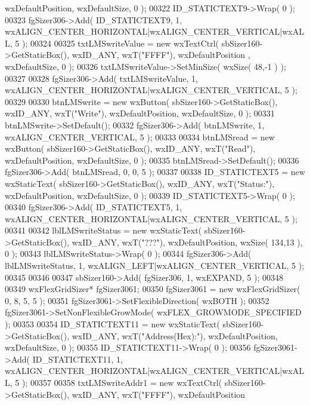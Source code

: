 \begin{DoxyCode}
      wxDefaultPosition, wxDefaultSize, 0 );
00322     ID_STATICTEXT9->Wrap( 0 );
00323     fgSizer306->Add( ID_STATICTEXT9, 1, wxALIGN\_CENTER\_HORIZONTAL|wxALIGN\_CENTER\_VERTICAL|wxALL, 5 );
00324     
00325     txtLMSwriteValue = \textcolor{keyword}{new} wxTextCtrl( sbSizer160->GetStaticBox(), wxID\_ANY, wxT(\textcolor{stringliteral}{"FFFF"}), wxDefaultPosition
      , wxDefaultSize, 0 );
00326     txtLMSwriteValue->SetMinSize( wxSize( 48,-1 ) );
00327     
00328     fgSizer306->Add( txtLMSwriteValue, 1, wxALIGN\_CENTER\_HORIZONTAL|wxALIGN\_CENTER\_VERTICAL, 5 );
00329     
00330     btnLMSwrite = \textcolor{keyword}{new} wxButton( sbSizer160->GetStaticBox(), wxID\_ANY, wxT(\textcolor{stringliteral}{"Write"}), wxDefaultPosition, 
      wxDefaultSize, 0 );
00331     btnLMSwrite->SetDefault(); 
00332     fgSizer306->Add( btnLMSwrite, 1, wxALIGN\_CENTER\_VERTICAL, 5 );
00333     
00334     btnLMSread = \textcolor{keyword}{new} wxButton( sbSizer160->GetStaticBox(), wxID\_ANY, wxT(\textcolor{stringliteral}{"Read"}), wxDefaultPosition, 
      wxDefaultSize, 0 );
00335     btnLMSread->SetDefault(); 
00336     fgSizer306->Add( btnLMSread, 0, 0, 5 );
00337     
00338     ID_STATICTEXT5 = \textcolor{keyword}{new} wxStaticText( sbSizer160->GetStaticBox(), wxID\_ANY, wxT(\textcolor{stringliteral}{"Status:"}), 
      wxDefaultPosition, wxDefaultSize, 0 );
00339     ID_STATICTEXT5->Wrap( 0 );
00340     fgSizer306->Add( ID_STATICTEXT5, 1, wxALIGN\_CENTER\_HORIZONTAL|wxALIGN\_CENTER\_VERTICAL, 5 );
00341     
00342     lblLMSwriteStatus = \textcolor{keyword}{new} wxStaticText( sbSizer160->GetStaticBox(), wxID\_ANY, wxT(\textcolor{stringliteral}{"???"}), 
      wxDefaultPosition, wxSize( 134,13 ), 0 );
00343     lblLMSwriteStatus->Wrap( 0 );
00344     fgSizer306->Add( lblLMSwriteStatus, 1, wxALIGN\_LEFT|wxALIGN\_CENTER\_VERTICAL, 5 );
00345     
00346     
00347     sbSizer160->Add( fgSizer306, 1, wxEXPAND, 5 );
00348     
00349     wxFlexGridSizer* fgSizer3061;
00350     fgSizer3061 = \textcolor{keyword}{new} wxFlexGridSizer( 0, 8, 5, 5 );
00351     fgSizer3061->SetFlexibleDirection( wxBOTH );
00352     fgSizer3061->SetNonFlexibleGrowMode( wxFLEX\_GROWMODE\_SPECIFIED );
00353     
00354     ID_STATICTEXT11 = \textcolor{keyword}{new} wxStaticText( sbSizer160->GetStaticBox(), wxID\_ANY, wxT(\textcolor{stringliteral}{"Address(Hex):"}), 
      wxDefaultPosition, wxDefaultSize, 0 );
00355     ID_STATICTEXT11->Wrap( 0 );
00356     fgSizer3061->Add( ID_STATICTEXT11, 1, wxALIGN\_CENTER\_HORIZONTAL|wxALIGN\_CENTER\_VERTICAL|wxALL, 5 );
00357     
00358     txtLMSwriteAddr1 = \textcolor{keyword}{new} wxTextCtrl( sbSizer160->GetStaticBox(), wxID\_ANY, wxT(\textcolor{stringliteral}{"FFFF"}), wxDefaultPosition

\end{DoxyCode}
